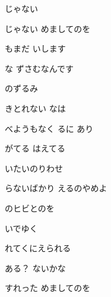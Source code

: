 \documentclass[a4paper,tate,twocolumn,12pt]{ltjtarticle}
\begin{document}
\thispagestyle{empty}

\begin{center}
{\LARGE {}じゃない}
\end{center}

\vspace{1em}

\begin{flushleft}

\noindent\begin{minipage}{\linewidth}
じゃない  めましてのを

もまだ いします

な ずさむなんです
\end{minipage}

\vspace{2em}

\noindent\begin{minipage}{\linewidth}
のずるみ

きとれない なは

べようもなく るに あり

がてる はえてる

いたいのりわせ

らないばかり えるのやめよ
\end{minipage}

\vspace{2em}

\noindent\begin{minipage}{\linewidth}
のヒビとのを

いでゆく

れてくにえられる

ある？ ないかな
\end{minipage}

\vspace{2em}

\noindent\begin{minipage}{\linewidth}
すれった めましてのを


\end{minipage}
\end{flushleft}
\end{document}
